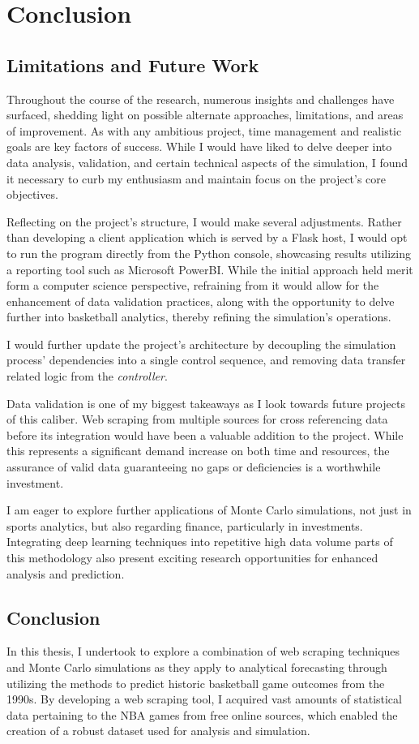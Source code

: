 \documentclass{thesis-ekf}
\theoremstyle{definition}
\theoremstyle{remark}
\begin{document}
\chapter{Conclusion}
\section{Limitations and Future Work}
Throughout the course of the research, numerous insights and challenges have surfaced, shedding light on possible alternate approaches, limitations, and areas of improvement. As with any ambitious project, time management and realistic goals are key factors of success. While I would have liked to delve deeper into data analysis, validation, and certain technical aspects of the simulation, I found it necessary to curb my enthusiasm and maintain focus on the project's core objectives.

Reflecting on the project's structure, I would make several adjustments. Rather than developing a client application which is served by a Flask host, I would opt to run the program directly from the Python console, showcasing results utilizing a reporting tool such as Microsoft PowerBI. While the initial approach held merit form a computer science perspective, refraining from it would allow for the enhancement of data validation practices, along with the opportunity to delve further into basketball analytics, thereby refining the simulation's operations.

I would further update the project's architecture by decoupling the simulation process' dependencies into a single control sequence, and removing data transfer related logic from the \emph{controller}.

Data validation is one of my biggest takeaways as I look towards future projects of this caliber. Web scraping from multiple sources for cross referencing data before its integration would have been a valuable addition to the project. While this represents a significant demand increase on both time and resources, the assurance of valid data guaranteeing no gaps or deficiencies is a worthwhile investment.

I am eager to explore further applications of Monte Carlo simulations, not just in sports analytics, but also regarding finance, particularly in investments. Integrating deep learning techniques into repetitive high data volume parts of this methodology also present exciting research opportunities for enhanced analysis and prediction.

\section{Conclusion}
In this thesis, I undertook to explore a combination of web scraping techniques and Monte Carlo simulations as they apply to analytical forecasting through utilizing the methods to predict historic basketball game outcomes from the 1990s. By developing a web scraping tool, I acquired vast amounts of statistical data pertaining to the NBA games from free online sources, which enabled the creation of a robust dataset used for analysis and simulation.
\end{document}
